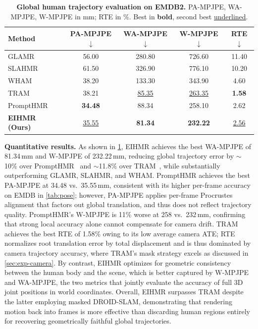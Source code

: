 \documentclass[runningheads]{llncs}
\begin{document}
\begin{table}[t]
  \caption{\textbf{Global human trajectory evaluation on EMDB2.} PA-MPJPE, WA-MPJPE, W-MPJPE in mm; RTE in \%. Best in \textbf{bold}, second best \underline{underlined}.}
  \label{tab:global}
  \centering
  \setlength{\tabcolsep}{6pt}
  \begin{tabular}{@{}lcccc@{}}
    \toprule
    Method & PA-MPJPE$\downarrow$ & WA-MPJPE$\downarrow$ & W-MPJPE$\downarrow$ & RTE$\downarrow$ \\
    \midrule
    GLAMR~\cite{GLAMR2022} & 56.00 & 280.80 & 726.60 & 11.40 \\
    SLAHMR~\cite{SLAHMR2023} & 61.50 & 326.90 & 776.10 & 10.20 \\
    WHAM~\cite{WHAM2024} & 38.20 & 133.30 & 343.90 & 4.60 \\
    TRAM~\cite{TRAM2024} & 38.21 & \underline{85.35} & \underline{263.35} & \textbf{1.58} \\
    PromptHMR~\cite{PromptHMR2024} & \textbf{34.48} & 88.34 & 258.10 & 2.62 \\
    \textbf{EIHMR (Ours)} & \underline{35.55} & \textbf{81.34} & \textbf{232.22} & \underline{2.56} \\
    \bottomrule
  \end{tabular}
\end{table}

\noindent\textbf{Quantitative results.}
As shown in \cref{tab:global}, EIHMR achieves the best WA-MPJPE of 81.34\,mm and W-MPJPE of 232.22\,mm, reducing global trajectory error by ${\sim}$10\% over PromptHMR~\cite{PromptHMR2024} and ${\sim}$11.8\% over TRAM~\cite{TRAM2024}, while substantially outperforming GLAMR, SLAHMR, and WHAM. PromptHMR achieves the best PA-MPJPE at 34.48 vs.\ 35.55\,mm, consistent with its higher per-frame accuracy on EMDB in \cref{tab:pose}; however, PA-MPJPE applies per-frame Procrustes alignment that factors out global translation, and thus does not reflect trajectory quality. PromptHMR's W-MPJPE is 11\% worse at 258 vs.\ 232\,mm, confirming that strong local accuracy alone cannot compensate for camera drift. TRAM achieves the best RTE of 1.58\% owing to its low average camera ATE; RTE normalizes root translation error by total displacement and is thus dominated by camera trajectory accuracy, where TRAM's mask strategy excels as discussed in \cref{sec:exp-camera}. By contrast, EIHMR optimizes for geometric consistency between the human body and the scene, which is better captured by W-MPJPE and WA-MPJPE, the two metrics that jointly evaluate the accuracy of full 3D joint positions in world coordinates. Overall, EIHMR surpasses TRAM despite the latter employing masked DROID-SLAM, demonstrating that rendering motion back into frames is more effective than discarding human regions entirely for recovering geometrically faithful global trajectories.
\end{document}
